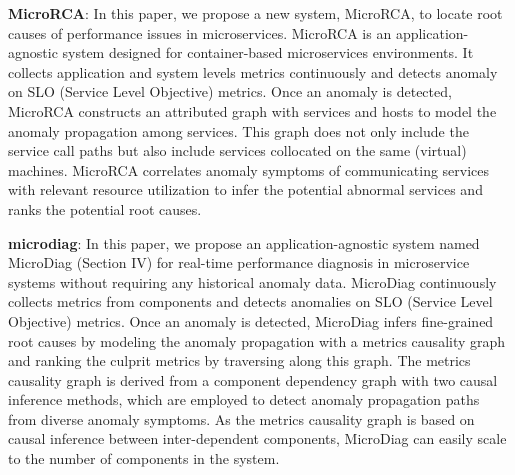 \textbf{MicroRCA}: In this paper, we propose a new system, MicroRCA, to locate root causes of performance issues in microservices. MicroRCA is an application-agnostic system designed for container-based microservices environments. It collects application and system levels metrics continuously and detects anomaly on SLO (Service Level Objective) metrics. Once an anomaly is detected, MicroRCA constructs an attributed graph with services and hosts to model the anomaly propagation among services. This graph does not only include the service call paths but also include services collocated on the same (virtual) machines. MicroRCA correlates anomaly symptoms of communicating services with relevant resource utilization to infer the potential abnormal services and ranks the potential root causes.

\textbf{microdiag}: In this paper, we propose an application-agnostic system named MicroDiag (Section IV) for real-time performance diagnosis in microservice systems without requiring any historical anomaly data. MicroDiag continuously collects metrics from components and detects anomalies on SLO (Service Level Objective) metrics. Once an anomaly is detected, MicroDiag infers fine-grained root causes by modeling the anomaly propagation with a metrics causality graph and ranking the culprit metrics by traversing along this graph. The metrics causality graph is derived from a component dependency graph with two causal inference methods, which are employed to detect anomaly propagation paths from diverse anomaly symptoms. As the metrics causality graph is based on causal inference between inter-dependent components, MicroDiag can easily scale to the number of components in the system. 






